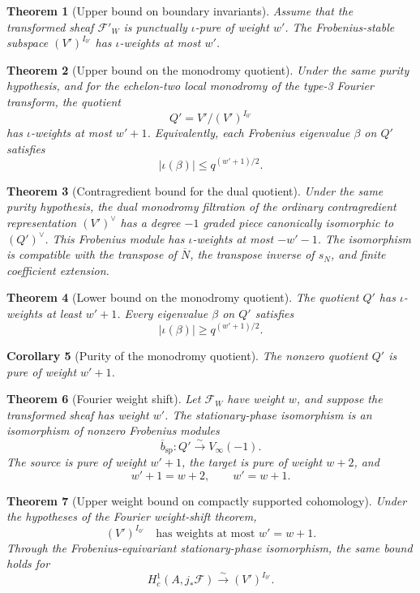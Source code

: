 \documentclass[10pt]{article}
\newtheorem{theorem}{Theorem}[section]
\newtheorem{corollary}[theorem]{Corollary}
\theoremstyle{definition}
\begin{document}
\begin{theorem}[Upper bound on boundary invariants]
Assume that the transformed sheaf \(\mathcal F'_W\) is punctually
\(\iota\)-pure of weight \(w'\).  The Frobenius-stable subspace
\((V')^{I_{0'}}\) has \(\iota\)-weights at most \(w'\).
\end{theorem}

\begin{theorem}[Upper bound on the monodromy quotient]
Under the same purity hypothesis, and for the echelon-two local monodromy
of the type-3 Fourier transform, the quotient
\[
 Q'=V'/(V')^{I_{0'}}
\]
has \(\iota\)-weights at most \(w'+1\).  Equivalently, each Frobenius
eigenvalue \(\beta\) on \(Q'\) satisfies
\[
 |\iota(\beta)|\le q^{(w'+1)/2}.
\]
\end{theorem}

\begin{theorem}[Contragredient bound for the dual quotient]
Under the same purity hypothesis, the dual monodromy filtration of the
ordinary contragredient representation \((V')^\vee\) has a degree \(-1\)
graded piece canonically isomorphic to \((Q')^\vee\).  This Frobenius module has
\(\iota\)-weights at most \(-w'-1\).  The isomorphism is compatible with the transpose of
\(\overline N\), the transpose inverse of \(s_N\), and finite coefficient
extension.
\end{theorem}

\begin{theorem}[Lower bound on the monodromy quotient]
The quotient \(Q'\) has \(\iota\)-weights at least \(w'+1\).  Every
eigenvalue \(\beta\) on \(Q'\) satisfies
\[
 |\iota(\beta)|\ge q^{(w'+1)/2}.
\]
\end{theorem}

\begin{corollary}[Purity of the monodromy quotient]
The nonzero quotient \(Q'\) is pure of weight \(w'+1\).
\end{corollary}

\begin{theorem}[Fourier weight shift]
Let \(\mathcal F_W\) have weight \(w\), and suppose the transformed sheaf
has weight \(w'\).  The stationary-phase isomorphism is an isomorphism of
nonzero Frobenius modules
\[
 \overline b_{\mathrm{sp}}:Q'\xrightarrow{\sim}V_\infty(-1).
\]
The source is pure of weight \(w'+1\), the target is pure of weight \(w+2\),
and
\[
 w'+1=w+2,
 \qquad w'=w+1.
\]
\end{theorem}

\begin{theorem}[Upper weight bound on compactly supported cohomology]
Under the hypotheses of the Fourier weight-shift theorem,
\[
 (V')^{I_{0'}}\quad\text{has weights at most }w'=w+1.
\]
Through the Frobenius-equivariant stationary-phase isomorphism, the same
bound holds for
\[
 H_c^1(A,j_*\mathcal F)\xrightarrow{\sim}(V')^{I_{0'}}.
\]
\end{theorem}
\end{document}

